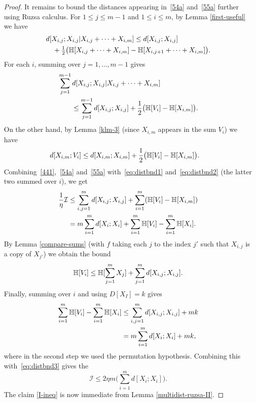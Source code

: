 \begin{proof}
It remains to bound the distances appearing in~\eqref{54a} and~\eqref{55a} further using Ruzsa calculus.
For $1 \leq j \leq m-1$ and $1 \leq i \leq m$, by Lemma \ref{first-useful} we have
\begin{align*} &d[ X_{i,j}; X_{i,j}| X_{i,j}+\cdots+X_{i,m}]
\leq d[X_{i,j}; X_{i,j}] \\
&\quad + \tfrac{1}{2} \bigl(\mathbb{H}[X_{i,j}+\cdots+X_{i,m}] - \mathbb{H}[X_{i,{j+1}}+\cdots+X_{i,m}]\bigr).
\end{align*}
For each $i$, summing over $j = 1,\dots, m-1$ gives
\begin{align}
  \nonumber
  &\sum_{j=1}^{m-1} d[X_{i,j}; X_{i,j}| X_{i,j}+\cdots+X_{i,m}] \\
  &\qquad \leq \sum_{j=1}^{m-1} d[X_{i,j}; X_{i,j}] + \frac12 \bigl( \mathbb{H}[V_i] - \mathbb{H}[X_{i,m}] \bigr).
  \label{eq:distbnd1}
\end{align}
On the other hand, by Lemma \ref{klm-3} (since $X_{i,m}$ appears in the sum $V_i$) we have
\begin{align}
  d[X_{i,m}; V_i]
  &\leq d[X_{i,m}; X_{i,m}] + \frac12 \bigl( \mathbb{H}[V_i] - \mathbb{H}[X_{i,m}] \bigr).
  \label{eq:distbnd2}
\end{align}
Combining~\eqref{441},~\eqref{54a} and~\eqref{55a} with~\eqref{eq:distbnd1} and~\eqref{eq:distbnd2} (the latter two summed over $i$), we get
\begin{align}
  \nonumber
  \frac1{\eta} {\mathcal I} &\leq \sum_{i,j=1}^m d[X_{i,j};X_{i,j}] + \sum_{i=1}^m (\mathbb{H}[V_i] - \mathbb{H}[X_{i,m}]) \\
      &= m \sum_{i=1}^m d[X_i; X_i] + \sum_{i=1}^m \mathbb{H}[V_i] - \sum_{i=1}^m \mathbb{H}[X_i].
      \label{eq:distbnd3}
\end{align}
By Lemma \ref{compare-sums} (with $f$ taking each $j$ to the index $j'$ such that $X_{i,j}$ is a copy of $X_{j'}$) we obtain the bound
\[
  \mathbb{H}[V_i] \leq \mathbb{H}[\sum_{j=1}^m X_j] + \sum_{j=1}^m d[X_{i,j}; X_{i,j}].
\]
Finally, summing over $i$ and using $D[X_I] = k$ gives
\begin{align*}
  \sum_{i=1}^m \mathbb{H}[V_i] - \sum_{i=1}^m \mathbb{H}[X_i] & \leq \sum_{i,j=1}^m d[X_{i,j}; X_{i,j}] + m k \\ & = m\sum_{i = 1}^m d[X_i; X_i] + mk,
\end{align*}
where in the second step we used the permutation hypothesis. Combining this with~\eqref{eq:distbnd3} gives the
$$
{\mathcal I} \leq 2\eta m \biggl( \sum_{i=1}^m d[X_i;X_i] \biggr).$$
The claim \eqref{I-ineq} is now immediate from Lemma \ref{multidist-ruzsa-II}.
\end{proof}


